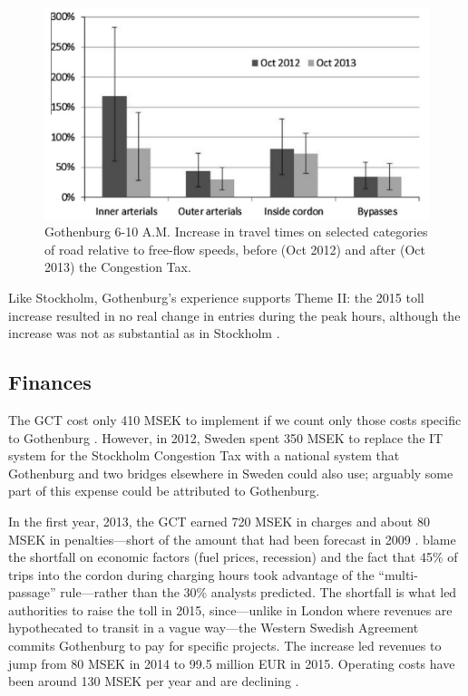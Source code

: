 \begin{figure}[ht]
\includegraphics[width=0.55\columnwidth]{../img/gburg-travel-times.png}

\caption{Gothenburg 6-10 A.M. Increase in travel times on selected categories of road relative to free-flow speeds, before (Oct 2012) and after (Oct 2013) the Congestion Tax. \citep{Borjesson2015} \label{fig:Gothenburg-travel-times}}

\end{figure}

Like Stockholm, Gothenburg's experience supports Theme II: the 2015 toll increase resulted in no real change in entries during the peak hours, although the increase was not as substantial as in Stockholm \citep[p. 43, Tab. 6]{Borjesson2018}.

\subsection{Finances}

The GCT cost only 410 MSEK to implement if we count only those costs specific to Gothenburg \citep[p. 40]{Borjesson2018}. However, in 2012, Sweden spent 350 MSEK to replace the IT system for the Stockholm Congestion Tax with a national system that Gothenburg and two bridges elsewhere in Sweden could also use; arguably some part of this expense could be attributed to Gothenburg. 

In the first year, 2013, the GCT earned 720 MSEK in charges and about 80 MSEK in penalties---short of the amount that had been forecast in 2009 \citep[pp. 142-143]{Borjesson2015}. \citet{Borjesson2015} blame the shortfall on economic factors (fuel prices, recession) and the fact that 45\% of trips into the cordon during charging hours took advantage of the ``multi-passage'' rule---rather than the 30\% analysts predicted. The shortfall is what led authorities to raise the toll in 2015, since---unlike in London where revenues are hypothecated to transit in a vague way---the Western Swedish Agreement commits Gothenburg to pay for specific projects. The increase led revenues to jump from 80 MSEK in 2014 to 99.5 million EUR in 2015. Operating costs have been around 130 MSEK per year and are declining \citep[table 3]{Borjesson2018}.




